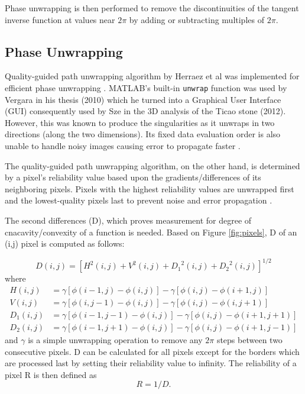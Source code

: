 Phase unwrapping is then performed to remove the discontinuities of the tangent inverse function at values near $2\pi$ by adding or subtracting multiples of $2\pi$.

\subsection{Phase Unwrapping}

Quality-guided path unwrapping algorithm by Herraez et al was implemented for efficient phase unwrapping \cite{Herraez2002}. 
MATLAB's built-in \texttt{unwrap} function was used by Vergara \cite{Vergara2010} in his thesis (2010) which he turned into a Graphical User Interface (GUI) consequently used by Sze \cite{Sze2012} in the 3D analysis of the Ticao stone (2012). However, this was known to produce the singularities as it unwraps in two directions (along the two dimensions). Its fixed data evaluation order is also unable to handle noisy images causing error to propagate faster \cite{Herraez2002}.

The quality-guided path unwrapping algorithm, on the other hand, is determined by a pixel's reliability value based upon the gradients/differences of its neighboring pixels. Pixels with the highest reliability values are unwrapped first and the lowest-quality pixels last to prevent noise and error propagation \cite{Herraez2002}.
 
The second differences (D), which proves measurement for degree of cnacavity/convexity of a function is needed. Based on Figure \ref{fig:pixels}, D of an (i,j) pixel is computed as follows:

\begin{equation}
D(i,j) = {[H^2(i,j)+V^2(i,j) +{D_1}^2(i,j) + {D_2}^2(i,j)]}^{1/2}
\end{equation}
where
\begin{align}
H(i,j) &= \gamma[\phi(i-1,j)-\phi(i,j)]- \gamma[\phi(i,j)-\phi(i+1,j)] \\
V(i,j) &= \gamma[\phi(i,j-1)-\phi(i,j)]- \gamma[\phi(i,j)-\phi(i,j+1)] \\
D_1(i,j) &= \gamma[\phi(i-1,j-1)-\phi(i,j)]- \gamma[\phi(i,j)-\phi(i+1,j+1)] \\
D_2(i,j) &= \gamma[\phi(i-1,j+1)-\phi(i,j)]- \gamma[\phi(i,j)-\phi(i+1,j-1)]
\end{align}
and $\gamma$ is a simple unwrapping operation to remove any $2\pi$ steps between two consecutive pixels. D can be calculated for all pixels except for the borders which are processed last by setting their reliability value to infinity. The reliability of a pixel R is then defined as
\begin{equation}
R = 1/D.
\end{equation}

